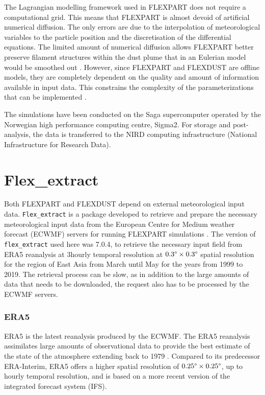 The Lagrangian modelling framework used in FLEXPART does not require a computational grid. This means that FLEXPART is almost devoid of artificial numerical diffusion. The only errors are due to the interpolation of meteorological variables to the particle position and the discretisation of the differential equations. The limited amount of numerical diffusion allows FLEXPART better preserve filament structures within the dust plume that in an Eulerian model would be smoothed out \parencite{cassiani_offline_2016}. However, since  FLEXPART and FLEXDUST are offline models, they are completely dependent on the quality and amount of information available in input data. This constrains the complexity of the parameterizations that can be implemented \parencite{flexpart_wetdep}. 

The simulations have been conducted on the Saga supercomputer operated by the Norwegian high performance 
computing centre, Sigma2. For storage and post-analysis, the data is transferred to the 
NIRD computing infrastructure (National Infrastructure for Research Data). 

\section{Flex\_extract}
Both FLEXPART and FLEXDUST depend on external meteorological input data. \verb|Flex_extract| is a package developed to retrieve and prepare the necessary meteorological input data from the European Centre for Medium weather forecast (ECWMF) servers for running FLEXPART simulations \parencite{tipka_flex_extract_2020}. 
The version of \verb|flex_extract| used here was 7.0.4, to retrieve the necessary input field from ERA5 reanalysis at 3hourly temporal resolution at $0.3\degree \times 0.3\degree$ spatial resolution for the region of East Asia from March until May for the years from 1999 to 2019. The retrieval process can be slow, as in addition to the large amounts of data that needs to be downloaded, the request also has to be processed by the ECWMF servers.     

\subsubsection{ERA5}
ERA5 is the latest reanalysis produced by the ECWMF. 
The ERA5 reanalysis assimilates large amounts of observational data to provide the best estimate of the state of the atmosphere extending back to 1979 \parencite{hersbach_era5_2020}. Compared to its predecessor ERA-Interim, ERA5 offers a higher spatial resolution of $0.25\degree \times 0.25\degree$, up to hourly temporal resolution, and is based on a more recent version of the integrated forecast system (IFS). 

